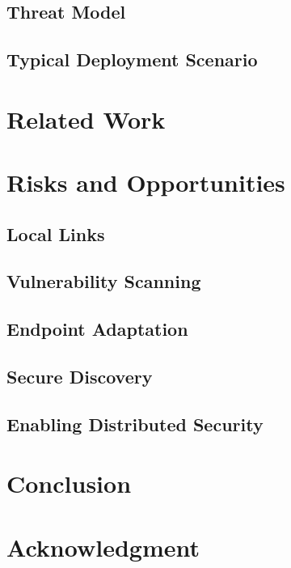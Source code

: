 \documentclass[conference]{IEEEtran}
\begin{document}
\subsection{Threat Model}


\subsection{Typical Deployment Scenario}


\section{Related Work}


\section{Risks and Opportunities}
\label{sec-risks-opportunities}

\subsection{Local Links}


\subsection{Vulnerability Scanning}


\subsection{Endpoint Adaptation}


\subsection{Secure Discovery}


\subsection{Enabling Distributed Security}


\section{Conclusion}


\section*{Acknowledgment}




\end{document}
